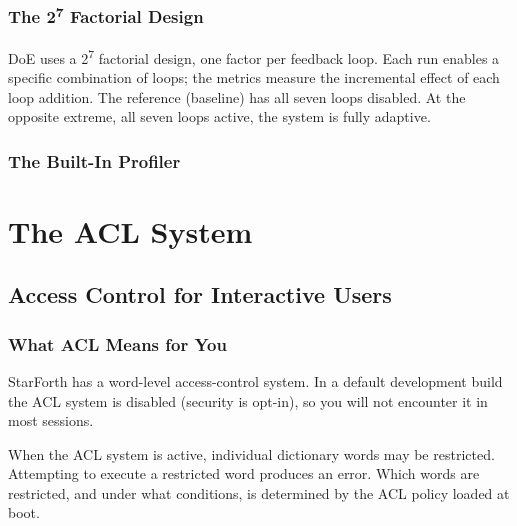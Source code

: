 \section{The 2\textsuperscript{7} Factorial Design}
\label{sec:doe-factorial}

DoE uses a 2\textsuperscript{7} factorial design, one factor per feedback loop.
Each run enables a specific combination of loops; the metrics measure the
incremental effect of each loop addition. The reference (baseline) has all
seven loops disabled. At the opposite extreme, all seven loops active, the
system is fully adaptive.

\section{The Built-In Profiler}
\label{sec:profiler}



\part{The ACL System}

\chapter{Access Control for Interactive Users}
\label{chap:acl}

\section{What ACL Means for You}
\label{sec:acl-user}

StarForth has a word-level access-control system. In a default development
build the ACL system is disabled (security is opt-in), so you will not
encounter it in most sessions.

When the ACL system is active, individual dictionary words may be restricted.
Attempting to execute a restricted word produces an error. Which words are
restricted, and under what conditions, is determined by the ACL policy loaded
at boot.

